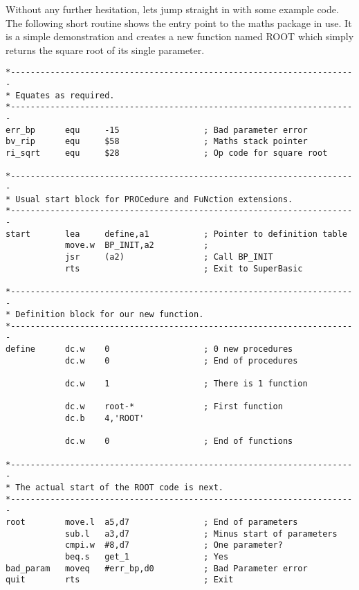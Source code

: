 Without any further hesitation, lets jump straight in with some
    example code. The following short routine shows the  entry point to
    the maths package in use. It is a simple demonstration and creates a new
    function named ROOT which simply returns the square root of its single
    parameter.

\begin{lstlisting}[firstnumber=1,caption={The Maths Package - Calculate Square Roots},label={lst:MathsPackageRoot}]
*----------------------------------------------------------------------
* Equates as required.
*----------------------------------------------------------------------
err_bp      equ     -15                 ; Bad parameter error
bv_rip      equ     $58                 ; Maths stack pointer
ri_sqrt     equ     $28                 ; Op code for square root

*----------------------------------------------------------------------
* Usual start block for PROCedure and FuNction extensions.
*----------------------------------------------------------------------
start       lea     define,a1           ; Pointer to definition table
            move.w  BP_INIT,a2          ; 
            jsr     (a2)                ; Call BP_INIT
            rts                         ; Exit to SuperBasic

*----------------------------------------------------------------------
* Definition block for our new function.
*----------------------------------------------------------------------
define      dc.w    0                   ; 0 new procedures
            dc.w    0                   ; End of procedures

            dc.w    1                   ; There is 1 function

            dc.w    root-*              ; First function
            dc.b    4,'ROOT'

            dc.w    0                   ; End of functions

*----------------------------------------------------------------------
* The actual start of the ROOT code is next.
*----------------------------------------------------------------------
root        move.l  a5,d7               ; End of parameters
            sub.l   a3,d7               ; Minus start of parameters
            cmpi.w  #8,d7               ; One parameter?
            beq.s   get_1               ; Yes
bad_param   moveq   #err_bp,d0          ; Bad Parameter error
quit        rts                         ; Exit


\end{lstlisting}
